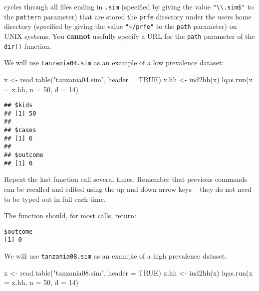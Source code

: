 \documentclass[
  12pt,
  a4paper]{book}
\newenvironment{Shaded}{\begin{snugshade}}{\end{snugshade}}
\newcommand{\AttributeTok}[1]{\textcolor[rgb]{0.77,0.63,0.00}{#1}}
\newcommand{\ConstantTok}[1]{\textcolor[rgb]{0.00,0.00,0.00}{#1}}
\newcommand{\DecValTok}[1]{\textcolor[rgb]{0.00,0.00,0.81}{#1}}
\newcommand{\FunctionTok}[1]{\textcolor[rgb]{0.00,0.00,0.00}{#1}}
\newcommand{\NormalTok}[1]{#1}
\newcommand{\OtherTok}[1]{\textcolor[rgb]{0.56,0.35,0.01}{#1}}
\newcommand{\StringTok}[1]{\textcolor[rgb]{0.31,0.60,0.02}{#1}}
\begin{document}
cycles through all files ending in \texttt{.sim} (specified by giving the value \texttt{"\textbackslash{}\textbackslash{}.sim\$"} to the \texttt{pattern} parameter) that are stored the \texttt{prfe} directory under the users home directory (specified by giving the value \texttt{"\textasciitilde{}/prfe"} to the \texttt{path} parameter) on UNIX systems. You \textbf{cannot} usefully specify a URL for the \texttt{path} parameter of the \texttt{dir()} function.

We will use \texttt{tanzania04.sim} as an example of a low prevalence dataset:

\begin{Shaded}
\begin{Highlighting}[]
\NormalTok{x }\OtherTok{\textless{}{-}} \FunctionTok{read.table}\NormalTok{(}\StringTok{"tanzania04.sim"}\NormalTok{, }\AttributeTok{header =} \ConstantTok{TRUE}\NormalTok{)}
\NormalTok{x.hh }\OtherTok{\textless{}{-}} \FunctionTok{ind2hh}\NormalTok{(x)}
\FunctionTok{lqas.run}\NormalTok{(}\AttributeTok{x =}\NormalTok{ x.hh, }\AttributeTok{n =} \DecValTok{50}\NormalTok{, }\AttributeTok{d =} \DecValTok{14}\NormalTok{)}
\end{Highlighting}
\end{Shaded}

\begin{verbatim}
## $kids
## [1] 50
## 
## $cases
## [1] 6
## 
## $outcome
## [1] 0
\end{verbatim}

Repeat the last function call several times. Remember that previous commands can be recalled and edited using the up and down arrow keys -- they do not need to be typed out in full each time.

The function should, for most calls, return:

\begin{verbatim}
$outcome
[1] 0
\end{verbatim}

We will use \texttt{tanzania08.sim} as an example of a high prevalence dataset:

\begin{Shaded}
\begin{Highlighting}[]
\NormalTok{x }\OtherTok{\textless{}{-}} \FunctionTok{read.table}\NormalTok{(}\StringTok{"tanzania08.sim"}\NormalTok{, }\AttributeTok{header =} \ConstantTok{TRUE}\NormalTok{)}
\NormalTok{x.hh }\OtherTok{\textless{}{-}} \FunctionTok{ind2hh}\NormalTok{(x)}
\FunctionTok{lqas.run}\NormalTok{(}\AttributeTok{x =}\NormalTok{ x.hh, }\AttributeTok{n =} \DecValTok{50}\NormalTok{, }\AttributeTok{d =} \DecValTok{14}\NormalTok{)}
\end{Highlighting}
\end{Shaded}
\end{document}
